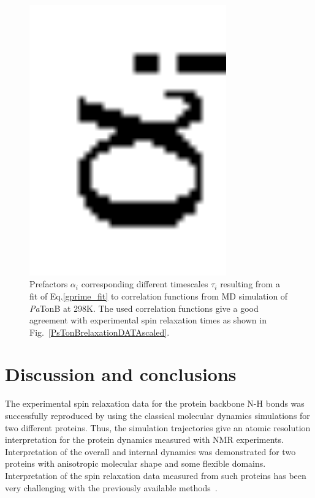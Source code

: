 \documentclass[pre,aps,floatfix,authordate1-4,twocolumn]{revtex4-1}
\begin{document}
\begin{figure}[!h]
  \includegraphics[width=8.5cm]{../Figs/coeffsPLOT.eps}%
  \caption{Prefactors $\alpha_i$ corresponding different timescales $\tau_i$
    resulting from a fit of Eq.\ref{gprime_fit} to correlation functions from
    MD simulation of {\it Pa}TonB at 298K. The used correlation functions give
    a good agreement with experimental spin relaxation times as shown in
    Fig.~\ref{PsTonBrelaxationDATAscaled}.  \label{coeffsPLOT}}%
\end{figure}



\section{Discussion and conclusions}
The experimental spin relaxation data for the protein backbone N-H bonds
was successfully reproduced by using the classical molecular dynamics
simulations for two different proteins.
Thus, the simulation trajectories give an atomic resolution
interpretation for the protein dynamics measured with NMR experiments.
Interpretation of the overall and internal dynamics was demonstrated for
two proteins with anisotropic molecular shape and some flexible domains. 
Interpretation of the spin relaxation data measured from
such proteins has been very challenging with the previously available
methods~\cite{barbato92,luginbuhl97}.
\end{document}
